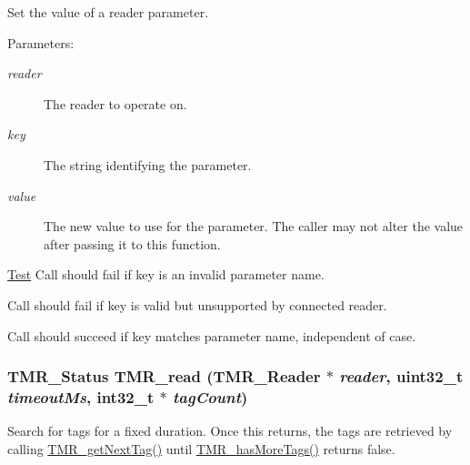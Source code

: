 Set the value of a reader parameter.

\begin{Desc}
\item[Parameters:]
\begin{description}
\item[{\em reader}]The reader to operate on. \item[{\em key}]The string identifying the parameter. \item[{\em value}]The new value to use for the parameter. The caller may not alter the value after passing it to this function.\end{description}
\end{Desc}
\begin{Desc}
\item[\hyperlink{test__test000010}{Test}]Call should fail if key is an invalid parameter name. 

Call should fail if key is valid but unsupported by connected reader. 

Call should succeed if key matches parameter name, independent of case. \end{Desc}
\hypertarget{group__reader_gb477ff41498adaa35ca5cae932ecfc70}{
\subsubsection[{TMR\_\-read}]{\setlength{\rightskip}{0pt plus 5cm}TMR\_\-Status TMR\_\-read ({\bf TMR\_\-Reader} $\ast$ {\em reader}, \/  uint32\_\-t {\em timeoutMs}, \/  int32\_\-t $\ast$ {\em tagCount})}}
\label{group__reader_gb477ff41498adaa35ca5cae932ecfc70}


Search for tags for a fixed duration. Once this returns, the tags are retrieved by calling \hyperlink{group__reader_gbee8bf69ae6010858c5425956308292b}{TMR\_\-getNextTag()} until \hyperlink{group__reader_g5925392bbb7aeafc0996144f354a533a}{TMR\_\-hasMoreTags()} returns false.

